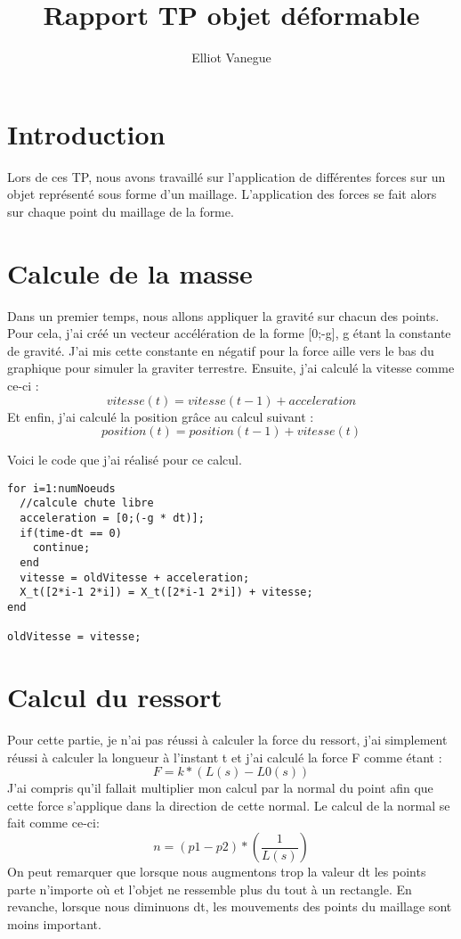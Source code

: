 \documentclass[a4paper,11pt]{article}
\title{Rapport TP objet déformable}
\author{Elliot Vanegue}
\begin{document}
\maketitle
\tableofcontents

\section{Introduction}
Lors de ces TP, nous avons travaillé sur l'application de différentes forces 
sur un objet représenté sous forme d'un maillage. L'application des forces 
se fait alors sur chaque point du maillage de la forme.

\section{Calcule de la masse}
Dans un premier temps, nous allons appliquer la gravité sur chacun des points.
Pour cela, j'ai créé un vecteur accélération de la forme [0;-g], g étant la constante
de gravité. J'ai mis cette constante en négatif pour la force aille vers le bas
du graphique pour simuler la graviter terrestre. Ensuite, j'ai calculé la vitesse comme ce-ci :
\begin{equation}
vitesse(t) = vitesse(t-1) + acceleration
\end{equation}
Et enfin, j'ai calculé la position grâce au calcul suivant : 
\begin{equation}
position(t) = position(t-1) + vitesse(t)
\end{equation}

Voici le code que j'ai réalisé pour ce calcul.
\begin{lstlisting}[caption=Code du Calcul de la gravité]
for i=1:numNoeuds
  //calcule chute libre
  acceleration = [0;(-g * dt)];
  if(time-dt == 0)
    continue;
  end
  vitesse = oldVitesse + acceleration;
  X_t([2*i-1 2*i]) = X_t([2*i-1 2*i]) + vitesse;
end
    
oldVitesse = vitesse;
\end{lstlisting}

\section{Calcul du ressort}
Pour cette partie, je n'ai pas réussi à calculer la force du ressort, j'ai simplement réussi
à calculer la longueur à l'instant t et j'ai calculé la force F comme étant :
\begin{equation}
F = k*(L(s)-L0(s))
\end{equation}
J'ai compris qu'il fallait multiplier mon calcul par la normal du point afin que cette force
s'applique dans la direction de cette normal. Le calcul de la normal se fait comme ce-ci:
\begin{equation}
n = (p1 - p2) * (\frac{1}{L(s)})
\end{equation}
On peut remarquer que lorsque nous augmentons trop la valeur dt les points parte n'importe où
et l'objet ne ressemble plus du tout à un rectangle. En revanche, lorsque nous diminuons dt,
les mouvements des points du maillage sont moins important.
\end{document}
